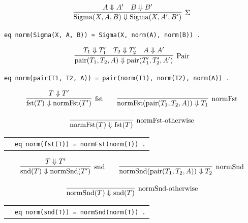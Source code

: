 \begin{center}
\begin{gather*}
  \infer[\Sigma]
  {\mathrm{Sigma}(X, A, B) \Downarrow \mathrm{Sigma}(X, A', B')}
  {A \Downarrow A' \quad B \Downarrow B'}
\end{gather*}

\texttt{eq norm(Sigma(X, A, B)) = Sigma(X, norm(A), norm(B)) .}
\end{center}

\begin{center}
\begin{gather*}
  \infer[\text{Pair}]
  {\mathrm{pair}(T_1, T_2, A) \Downarrow
   \mathrm{pair}(T_1', T_2', A')}
  {T_1 \Downarrow T_1'
   \quad
   T_2 \Downarrow T_2'
   \quad
   A \Downarrow A'}
\end{gather*}

\texttt{eq norm(pair(T1, T2, A)) =
pair(norm(T1), norm(T2), norm(A)) .}
\end{center}

\begin{gather*}
  \infer[\text{fst}]
  {\mathrm{fst}(T) \Downarrow \mathrm{normFst}(T')}
  {T \Downarrow T'}
  \qquad
  \infer[\text{normFst}]
  {\mathrm{normFst}(\mathrm{pair}(T_1, T_2, A)) \Downarrow T_1}
  {}
  \\[1em]
  \infer[\text{normFst-otherwise}]
  {\mathrm{normFst}(T) \Downarrow \mathrm{fst}(T)}
  {}
\end{gather*}

\begin{center}
\begin{tabular}{@{}c@{\qquad}p{6cm}@{}}
  &
    \verb|eq norm(fst(T)) = normFst(norm(T)) .|
\end{tabular}
\end{center}

\begin{gather*}
  \infer[\text{snd}]
  {\mathrm{snd}(T) \Downarrow \mathrm{normSnd}(T')}
  {T \Downarrow T'}
  \qquad
  \infer[\text{normSnd}]
  {\mathrm{normSnd}(\mathrm{pair}(T_1, T_2, A)) \Downarrow T_2}
  {}
  \\[1em]
  \infer[\text{normSnd-otherwise}]
  {\mathrm{normSnd}(T) \Downarrow \mathrm{snd}(T)}
  {}
\end{gather*}

\begin{center}
\begin{tabular}{@{}c@{\qquad}p{6cm}@{}}
  &
    \verb|eq norm(snd(T)) = normSnd(norm(T)) .|
\end{tabular}
\end{center}

